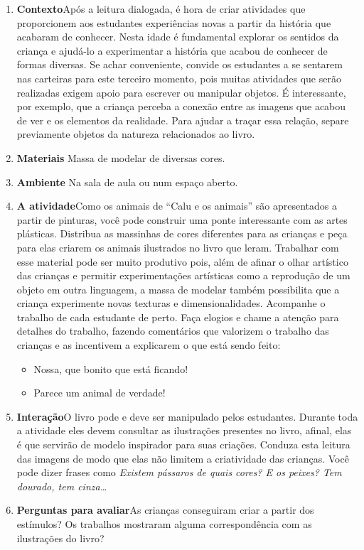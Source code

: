 \documentclass[11pt]{extarticle}
\begin{document}
\begin{enumerate}
\item \textbf{Contexto}\quad Após a leitura dialogada, é hora de criar 
atividades que proporcionem aos estudantes experiências novas a partir da história 
que acabaram de conhecer. Nesta idade é fundamental explorar os sentidos da criança e 
ajudá-lo a experimentar a história que acabou de conhecer de formas diversas. Se achar 
conveniente, convide os estudantes a se sentarem nas carteiras para este terceiro 
momento, pois muitas atividades que serão realizadas exigem apoio para escrever 
ou manipular objetos. É interessante, por exemplo, que a criança perceba a conexão 
entre as imagens que acabou de ver e os elementos da realidade. Para ajudar a traçar 
essa relação, separe previamente objetos da natureza relacionados ao livro. 

\item \textbf{Materiais}\quad 
Massa de modelar de diversas cores.
\item \textbf{Ambiente}\quad  
Na sala de aula ou num espaço aberto. 

\item \textbf{A atividade}\quad Como os animais de “Calu e os animais” são
apresentados a partir de pinturas, você pode construir uma ponte interessante com as 
artes plásticas. Distribua as massinhas de cores diferentes para as crianças
e peça para elas criarem os animais ilustrados no livro que leram. 
Trabalhar com esse material pode ser muito produtivo pois, além de afinar o 
olhar artístico das crianças e permitir experimentações artísticas como a reprodução
de um objeto em outra linguagem, a massa de modelar também possibilita que a criança 
experimente novas texturas e dimensionalidades. Acompanhe o trabalho de cada 
estudante de perto. Faça elogios e chame a atenção para detalhes do trabalho, 
fazendo comentários que valorizem o trabalho das crianças e as incentivem a explicarem 
o que está sendo feito: 

\begin{itemize}
\item Nossa, que bonito que está ficando!
\item Parece um animal de verdade!
\end{itemize}

\item \textbf{Interação}\quad O livro pode e deve ser 
manipulado pelos estudantes. Durante toda a atividade
eles devem consultar as ilustrações presentes no livro,
afinal, elas é que servirão de modelo inspirador para suas criações.
Conduza esta leitura das imagens de modo que elas não limitem
a criatividade das crianças. Você pode dizer frases como \emph{Existem 
pássaros de quais cores? E os peixes? Tem dourado, tem cinza\dots{}}

\item \textbf{Perguntas para avaliar}\quad As crianças conseguiram criar a partir dos estímulos?
Os trabalhos mostraram alguma correspondência com as ilustrações do livro?


\end{enumerate}
\end{document}

